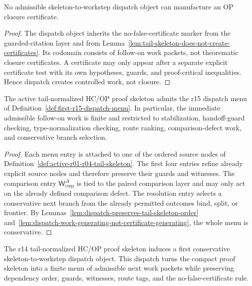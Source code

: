 \begin{lemma}
\label{lem:dispatch-work-generating-not-certificate-generating}
No admissible skeleton-to-workstep dispatch object can manufacture an OP closure certificate.
\end{lemma}

\begin{proof}
The dispatch object inherits the no-false-certificate marker from the guarded-citation layer and from Lemma~\ref{lem:tail-skeleton-does-not-create-certificates}. Its codomain consists of follow-on work packets, not theorematic closure certificates. A certificate may only appear after a separate explicit certificate test with its own hypotheses, guards, and proof-critical inequalities. Hence dispatch creates controlled work, not closure.
\end{proof}

\begin{proposition}
\label{prop:first-controlled-next-work-selection-hcop-skeleton}
The active tail-normalized HC/OP proof skeleton admits the r15 dispatch menu of Definition~\ref{def:first-r15-dispatch-menu}. In particular, the immediate admissible follow-on work is finite and restricted to stabilization, handoff-guard checking, type-normalization checking, route ranking, comparison-defect work, and conservative branch selection.
\end{proposition}

\begin{proof}
Each menu entry is attached to one of the ordered source nodes of Definition~\ref{def:active-r01-r04-tail-skeleton}. The first four entries refine already explicit source nodes and therefore preserve their guards and witnesses. The comparison entry \(\mathsf W_{\mathrm{cmp}}^{\Delta}\) is tied to the paired comparison layer and may only act on the already defined comparison defect. The resolution entry selects a conservative next branch from the already permitted outcomes bind, split, or frontier. By Lemmas~\ref{lem:dispatch-preserves-tail-skeleton-order} and~\ref{lem:dispatch-work-generating-not-certificate-generating}, the whole menu is conservative.
\end{proof}

\begin{theorem}
\label{thm:first-skeleton-to-workstep-hcop-dispatch}
The r14 tail-normalized HC/OP proof skeleton induces a first conservative skeleton-to-workstep dispatch object. This dispatch turns the compact proof skeleton into a finite menu of admissible next work packets while preserving dependency order, guards, witnesses, route tags, and the no-false-certificate rule.
\end{theorem}

